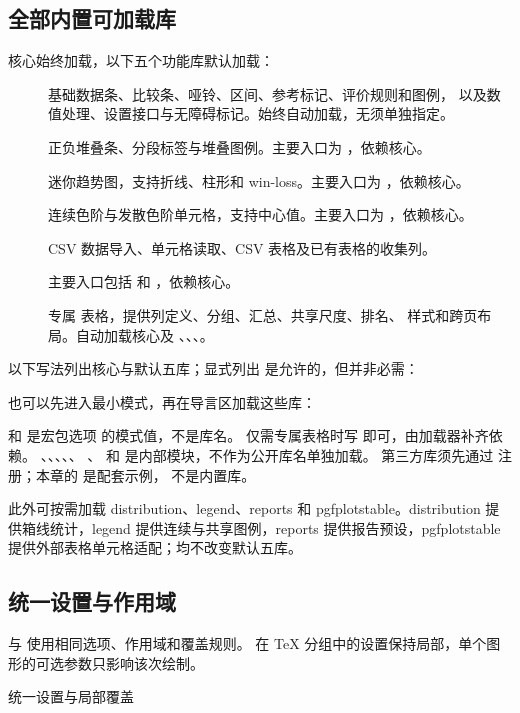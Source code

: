 \subsection{全部内置可加载库}
核心始终加载，以下五个功能库默认加载：
\begin{description}
\item[] 基础数据条、比较条、哑铃、区间、参考标记、评价规则和图例，
以及数值处理、设置接口与无障碍标记。始终自动加载，无须单独指定。
\item[] 正负堆叠条、分段标签与堆叠图例。主要入口为 \key{\gradstack}，依赖核心。
\item[] 迷你趋势图，支持折线、柱形和 win-loss。主要入口为 \key{\gradspark}，依赖核心。
\item[] 连续色阶与发散色阶单元格，支持中心值。主要入口为 \key{\gradheat}，依赖核心。
\item[] CSV 数据导入、单元格读取、CSV 表格及已有表格的收集列。\par
主要入口包括 \key{\gradbarsloadcsv} 和 \key{\gradbarscolumn}，依赖核心。
\item[] 专属  表格，提供列定义、分组、汇总、共享尺度、排名、
样式和跨页布局。自动加载核心及 、、、。
\end{description}
以下写法列出核心与默认五库；显式列出  是允许的，但并非必需：
\begin{codeonly}
\usepackage[libraries={core,stack,spark,heat,csv,table}]{gradbars}
\end{codeonly}
也可以先进入最小模式，再在导言区加载这些库：
\begin{codeonly}
\usepackage[libraries=none]{gradbars}
\end{codeonly}
 和  是宏包选项  的模式值，不是库名。
仅需专属表格时写  即可，由加载器补齐依赖。
、、、、、
、 和  是内部模块，不作为公开库名单独加载。
第三方库须先通过 \key{\gradbarsdeclarelibrary} 注册；本章的  是配套示例，
不是内置库。

此外可按需加载 distribution、legend、reports 和 pgfplotstable。distribution 提供箱线统计，legend 提供连续与共享图例，reports 提供报告预设，pgfplotstable 提供外部表格单元格适配；均不改变默认五库。

\subsection{统一设置与作用域}
 与  使用相同选项、作用域和覆盖规则。
在 TeX 分组中的设置保持局部，单个图形的可选参数只影响该次绘制。
\begin{example}{统一设置与局部覆盖}
{}
\end{example}

